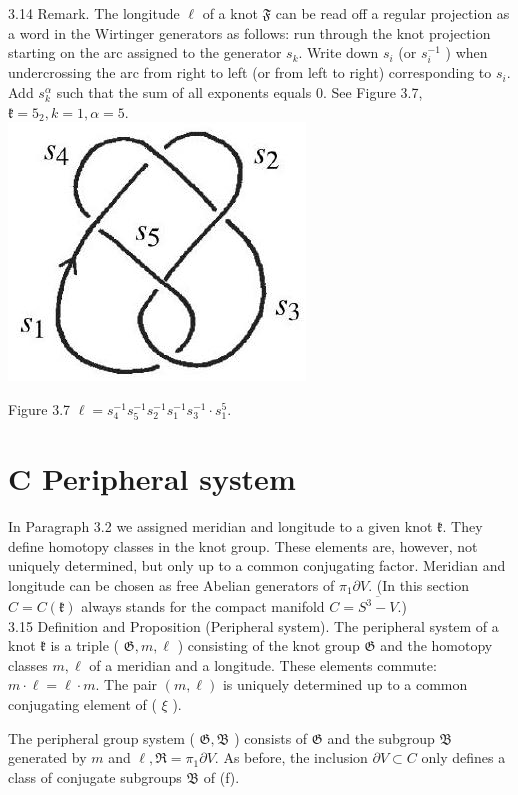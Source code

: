 \documentclass[10pt, letterpaper]{article}
\begin{document}
3.14 Remark. The longitude $\ell$ of a knot $\mathfrak{F}$ can be read off a regular projection as a word in the Wirtinger generators as follows: run through the knot projection starting on the arc assigned to the generator $s_{k}$. Write down $s_{i}$ (or $s_{i}^{-1}$ ) when undercrossing the arc from right to left (or from left to right) corresponding to $s_{i}$. Add $s_{k}^{\alpha}$ such that the sum of all exponents equals 0. See Figure 3.7, $\mathfrak{k}=5_{2}, k=1, \alpha=5$.\\
\includegraphics[scale=0.2, center]{2025_05_21_9c06be8de7a55410f8c1g-054}

Figure 3.7 $\ell=s_{4}^{-1} s_{5}^{-1} s_{2}^{-1} s_{1}^{-1} s_{3}^{-1} \cdot s_{1}^{5}$.

\section*{C Peripheral system}
In Paragraph 3.2 we assigned meridian and longitude to a given knot $\mathfrak{k}$. They define homotopy classes in the knot group. These elements are, however, not uniquely determined, but only up to a common conjugating factor. Meridian and longitude can be chosen as free Abelian generators of $\pi_{1} \partial V$. (In this section $C=C(\mathfrak{k})$ always stands for the compact manifold $C=\overline{S^{3}-V}$.)\\
3.15 Definition and Proposition (Peripheral system). The peripheral system of a knot $\mathfrak{k}$ is a triple ( $\mathfrak{G}, m, \ell$ ) consisting of the knot group $\mathfrak{G}$ and the homotopy classes $m, \ell$ of a meridian and a longitude. These elements commute: $m \cdot \ell=\ell \cdot m$. The pair $(m, \ell)$ is uniquely determined up to a common conjugating element of ( $\xi$ ).

The peripheral group system ( $\mathfrak{G}, \mathfrak{B}$ ) consists of $\mathfrak{G}$ and the subgroup $\mathfrak{B}$ generated by $m$ and $\ell, \Re=\pi_{1} \partial V$. As before, the inclusion $\partial V \subset C$ only defines a class of conjugate subgroups $\mathfrak{B}$ of (f).
\end{document}
